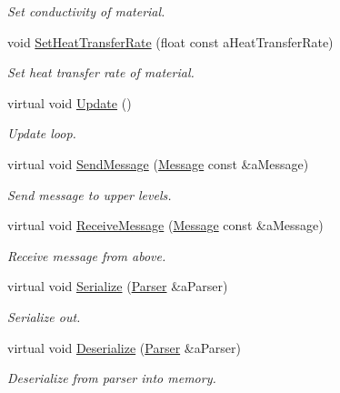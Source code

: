 \begin{DoxyCompactItemize}
\begin{DoxyCompactList}\small\item\em Set conductivity of material. \end{DoxyCompactList}\item 
void \hyperlink{classChemistryMaterial_afbbd05b0cb008f3ec35b345f06ca5caa}{Set\+Heat\+Transfer\+Rate} (float const a\+Heat\+Transfer\+Rate)
\begin{DoxyCompactList}\small\item\em Set heat transfer rate of material. \end{DoxyCompactList}\item 
virtual void \hyperlink{classChemistryMaterial_a138000ab29b8567bd6dc766cb976e712}{Update} ()
\begin{DoxyCompactList}\small\item\em Update loop. \end{DoxyCompactList}\item 
virtual void \hyperlink{classChemistryMaterial_a8fe8185fec324a55b470f3c62b09209d}{Send\+Message} (\hyperlink{classMessage}{Message} const \&a\+Message)
\begin{DoxyCompactList}\small\item\em Send message to upper levels. \end{DoxyCompactList}\item 
virtual void \hyperlink{classChemistryMaterial_af159d6d1cf20bef34fe9c0ec95f0157e}{Receive\+Message} (\hyperlink{classMessage}{Message} const \&a\+Message)
\begin{DoxyCompactList}\small\item\em Receive message from above. \end{DoxyCompactList}\item 
virtual void \hyperlink{classChemistryMaterial_a0795a1607c7a771bedbc48c6a87b6d94}{Serialize} (\hyperlink{classParser}{Parser} \&a\+Parser)
\begin{DoxyCompactList}\small\item\em Serialize out. \end{DoxyCompactList}\item 
virtual void \hyperlink{classChemistryMaterial_a2c3eb3d1b2560c62359e886255a6b700}{Deserialize} (\hyperlink{classParser}{Parser} \&a\+Parser)
\begin{DoxyCompactList}\small\item\em Deserialize from parser into memory. \end{DoxyCompactList}\end{DoxyCompactItemize}
